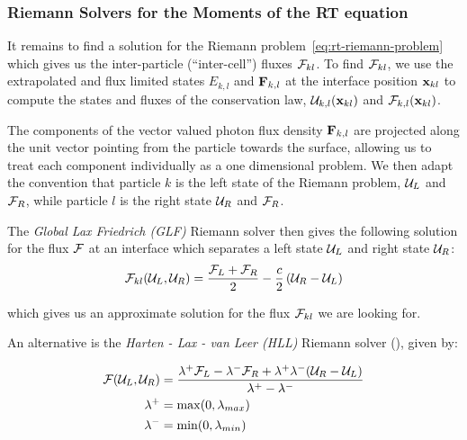 \subsubsection{Riemann Solvers for the Moments of the RT equation}\label{chap:riemann-rt}

It remains to find a solution for the Riemann problem~\ref{eq:rt-riemann-problem} which gives us
the inter-particle (``inter-cell'') fluxes $\mathcal{F}_{kl}$. To find $\mathcal{F}_{kl}$, we use the extrapolated and
flux limited states $E_{k,l}$ and $\mathbf{F}_{k,l}$ at the interface position $\mathbf{x}_{kl}$ to compute the
states and fluxes of the conservation law, $\mathcal{U}_{k,l}(\mathbf{x}_{kl})$ and $\mathcal{F}_{k,l}(\mathbf{x}_{kl})$.

The components of the vector valued photon flux density $\mathbf{F}_{k,l}$ are projected along the unit
vector pointing from the particle towards the surface, allowing us to treat each component
individually as a one dimensional problem. We then adapt the convention that particle $k$ is the
left state of the Riemann problem, $\mathcal{U}_L$ and $\mathcal{F}_R$, while particle $l$ is the right state $\mathcal{U}_R$
and $\mathcal{F}_R$.

The \emph{Global Lax Friedrich (GLF)} Riemann solver \citep{ramses-rt13} then gives the
following solution for the flux $\mathcal{F}$ at an interface which separates a left state $\mathcal{U}_L$
and right state $\mathcal{U}_R$:
\begin{equation}
	\mathcal{F}_{kl}(\mathcal{U}_L, \mathcal{U}_R) =
		\frac{\mathcal{F}_{L} + \mathcal{F}_{R}}{2} -
		\frac{c}{2} \left(\mathcal{U}_R - \mathcal{U}_L \right) \label{eq:riemann-GLF}
\end{equation}

which gives us an approximate solution for the flux $\mathcal{F}_{kl}$ we are looking for.



An alternative is the \emph{Harten - Lax - van Leer (HLL)} Riemann solver
(\cite{gonzalezHERACLESThreedimensionalRadiation2007}), given by:

\begin{align}
	\mathcal{F}(\mathcal{U}_L, \mathcal{U}_R) &=
		\frac{ \lambda^{+} \mathcal{F}_{L} - \lambda^{-} \mathcal{F}_{R} +  \lambda^{+}
\lambda^{-} (\mathcal{U}_R - \mathcal{U}_L)}{ \lambda^{+} - \lambda^{-} }
\label{eq:riemann-HLL} \\
    \lambda^+ &= \max(0, \lambda_{max})\\
    \lambda^- &= \min(0, \lambda_{min})
\end{align}


